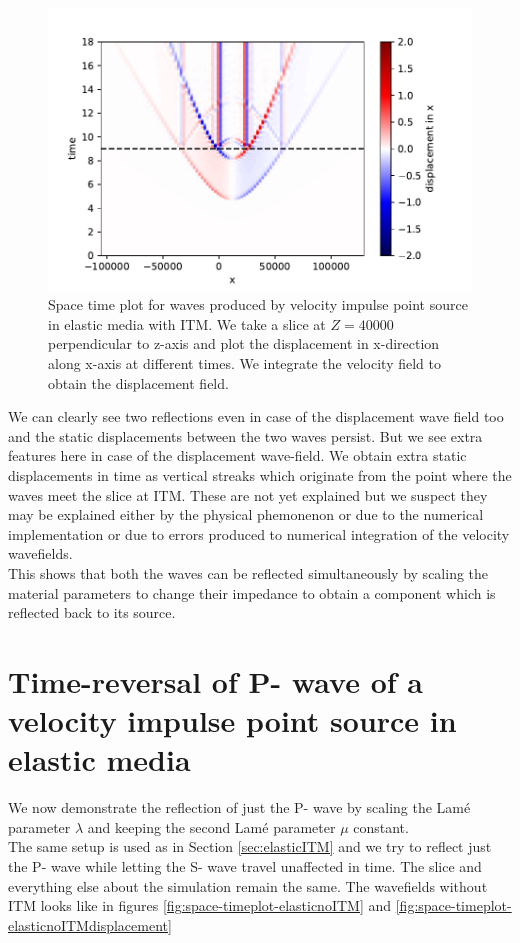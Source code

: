 \begin{figure}
    \centering
    \includegraphics[width=0.75\linewidth]{figures/Elastic-tworeflections-displacement.pdf}
    \caption{Space time plot for waves produced by velocity impulse point source in elastic media with \ac{ITM}. We take a slice at $Z=40000$ perpendicular to z-axis
    and plot the displacement in x-direction along x-axis at different times. We integrate the velocity field to obtain the displacement field.}
    \label{fig:space-timeplot-elasticITMdisplacement}
\end{figure}

We can clearly see two reflections even in case of the displacement wave field too and the static displacements between the two waves persist. But we see extra features
here in case of the displacement wave-field. We obtain extra static displacements in time as vertical streaks which originate from the point where the waves meet the slice
at \ac{ITM}. These are not yet explained but we suspect they may be explained either by the physical phemonenon or due to the numerical implementation or due to errors
produced to numerical integration of the velocity wavefields. \\

This shows that both the waves can be reflected simultaneously by scaling the material parameters to change their impedance to obtain a component which 
is reflected back to its source. \\

\section{Time-reversal of P- wave of a velocity impulse point source in elastic media} \label{sec:elasticITMpwave}
We now demonstrate the reflection of just the P- wave by scaling the Lam\'{e} parameter $\lambda$ and keeping the second Lam\'{e} parameter $\mu$ constant.\\
The same setup is used as in Section \ref{sec:elasticITM} and we try to reflect just the P- wave while letting the S- wave travel unaffected in time. The slice
and everything else about the simulation remain the same. The wavefields without \ac{ITM} looks like in figures \ref{fig:space-timeplot-elasticnoITM} and
\ref{fig:space-timeplot-elasticnoITMdisplacement}

